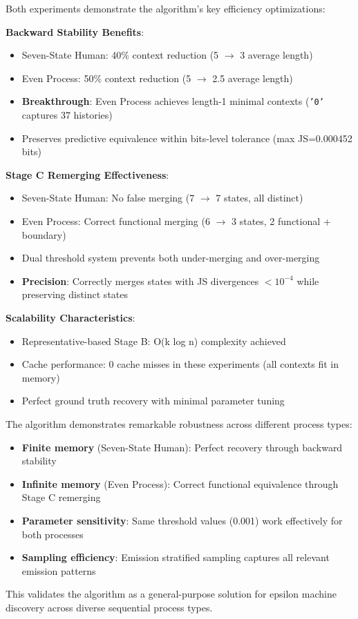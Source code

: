 \documentclass[11pt]{article}
\begin{document}
\begin{notebox}
Both experiments demonstrate the algorithm's key efficiency optimizations:

\textbf{Backward Stability Benefits}:
\begin{itemize}
\item Seven-State Human: 40\% context reduction (5 $\rightarrow$ 3 average length)
\item Even Process: 50\% context reduction (5 $\rightarrow$ 2.5 average length)
\item \textbf{Breakthrough}: Even Process achieves length-1 minimal contexts (\texttt{'0'} captures 37 histories)
\item Preserves predictive equivalence within bits-level tolerance (max JS=0.000452 bits)
\end{itemize}

\textbf{Stage C Remerging Effectiveness}:
\begin{itemize}
\item Seven-State Human: No false merging (7 $\rightarrow$ 7 states, all distinct)
\item Even Process: Correct functional merging (6 $\rightarrow$ 3 states, 2 functional + boundary)
\item Dual threshold system prevents both under-merging and over-merging
\item \textbf{Precision}: Correctly merges states with JS divergences $<10^{-4}$ while preserving distinct states
\end{itemize}

\textbf{Scalability Characteristics}:
\begin{itemize}
\item Representative-based Stage B: O(k log n) complexity achieved
\item Cache performance: 0 cache misses in these experiments (all contexts fit in memory)
\item Perfect ground truth recovery with minimal parameter tuning
\end{itemize}
\end{notebox}

\begin{resultbox}
The algorithm demonstrates remarkable robustness across different process types:

\begin{itemize}
\item \textbf{Finite memory} (Seven-State Human): Perfect recovery through backward stability
\item \textbf{Infinite memory} (Even Process): Correct functional equivalence through Stage C remerging
\item \textbf{Parameter sensitivity}: Same threshold values (0.001) work effectively for both processes
\item \textbf{Sampling efficiency}: Emission stratified sampling captures all relevant emission patterns
\end{itemize}

This validates the algorithm as a general-purpose solution for epsilon machine discovery across diverse sequential process types.
\end{resultbox}
\end{document}
